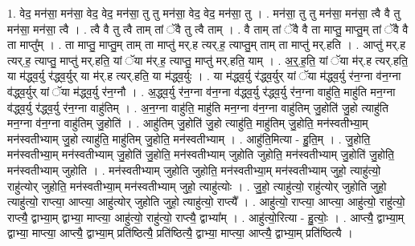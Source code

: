 \documentclass[17pt]{extarticle}
\begin{document}
1. वेद॒ मन॑सा॒ मन॑सा॒ वेद॒ वेद॒ मन॑सा॒ तु तु मन॑सा॒ वेद॒ वेद॒ मन॑सा॒ तु । . मन॑सा॒ तु तु मन॑सा॒ मन॑सा॒ त्वै वै तु मन॑सा॒ मन॑सा॒ त्वै । . त्वै वै तु त्वै ताम् तां ॅवै तु त्वै ताम् । . वै ताम् तां ॅवै वै ता माप्तु॒ माप्तु॒म् तां ॅवै वै ता माप्तु᳚म् । . ता माप्तु॒ माप्तु॒म् ताम् ता माप्तु॑ मर्.ह त्यर्.ह॒ त्याप्तु॒म् ताम् ता माप्तु॑ मर्.हति । . आप्तु॑ मर्.ह त्यर्.ह॒ त्याप्तु॒ माप्तु॑ मर्.हति॒ यां ॅया म॑र्.ह॒ त्याप्तु॒ माप्तु॑ मर्.हति॒ याम् । . अ॒र्॒.ह॒ति॒ यां ॅया म॑र्.ह त्यर्.हति॒ या म॑द्ध्व॒र्यु र॑द्ध्व॒र्युर् या म॑र्.ह त्यर्.हति॒ या म॑द्ध्व॒र्युः । . या म॑द्ध्व॒र्यु र॑द्ध्व॒र्युर् यां ॅया म॑द्ध्व॒र्यु र॑न॒ग्ना व॑न॒ग्ना व॑द्ध्व॒र्युर् यां ॅया म॑द्ध्व॒र्यु र॑न॒ग्नौ । . अ॒द्ध्व॒र्यु र॑न॒ग्ना व॑न॒ग्ना व॑द्ध्व॒र्यु र॑द्ध्व॒र्यु र॑न॒ग्ना वाहु॑ति॒ माहु॑ति मन॒ग्ना व॑द्ध्व॒र्यु र॑द्ध्व॒र्यु र॑न॒ग्ना वाहु॑तिम् । . अ॒न॒ग्ना वाहु॑ति॒ माहु॑ति मन॒ग्ना व॑न॒ग्ना वाहु॑तिम् जु॒होति॑ जु॒हो त्याहु॑ति मन॒ग्ना व॑न॒ग्ना वाहु॑तिम् जु॒होति॑ । . आहु॑तिम् जु॒होति॑ जु॒हो त्याहु॑ति॒ माहु॑तिम् जु॒होति॒ मन॑स्वतीभ्या॒म् मन॑स्वतीभ्याम् जु॒हो त्याहु॑ति॒ माहु॑तिम् जु॒होति॒ मन॑स्वतीभ्याम् । . आहु॑ति॒मित्या - हु॒ति॒म् । . जु॒होति॒ मन॑स्वतीभ्या॒म् मन॑स्वतीभ्याम् जु॒होति॑ जु॒होति॒ मन॑स्वतीभ्याम् जुहोति जुहोति॒ मन॑स्वतीभ्याम् जु॒होति॑ जु॒होति॒ मन॑स्वतीभ्याम् जुहोति । . मन॑स्वतीभ्याम् जुहोति जुहोति॒ मन॑स्वतीभ्या॒म् मन॑स्वतीभ्याम् जुहो॒ त्याहु॑त्यो॒ राहु॑त्योर् जुहोति॒ मन॑स्वतीभ्या॒म् मन॑स्वतीभ्याम् जुहो॒ त्याहु॑त्योः । . जु॒हो॒ त्याहु॑त्यो॒ राहु॑त्योर् जुहोति जुहो॒ त्याहु॑त्यो॒ राप्त्या॒ आप्त्या॒ आहु॑त्योर् जुहोति जुहो॒ त्याहु॑त्यो॒ राप्त्यै᳚ । . आहु॑त्यो॒ राप्त्या॒ आप्त्या॒ आहु॑त्यो॒ राहु॑त्यो॒ राप्त्यै॒ द्वाभ्या॒म् द्वाभ्या॒ माप्त्या॒ आहु॑त्यो॒ राहु॑त्यो॒ राप्त्यै॒ द्वाभ्या᳚म् । . आहु॑त्यो॒रित्या - हु॒त्योः॒ । . आप्त्यै॒ द्वाभ्या॒म् द्वाभ्या॒ माप्त्या॒ आप्त्यै॒ द्वाभ्या॒म् प्रति॑ष्ठित्यै॒ प्रति॑ष्ठित्यै॒ द्वाभ्या॒ माप्त्या॒ आप्त्यै॒ द्वाभ्या॒म् प्रति॑ष्ठित्यै । \newline
\end{document}
